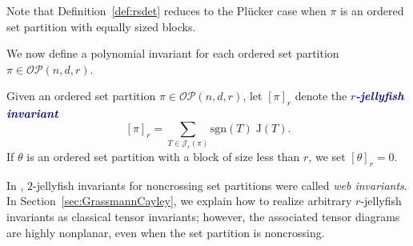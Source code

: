 \documentclass[ALCO, Unicode]{cedram}
\numberwithin{equation}{section}
\newcommand{\rstab}{\mathcal{J}}
\newcommand{\rspoly}{\mathrm{J}}
\newcommand{\sgn}{\mathrm{sgn}}
\newcommand{\ordsetpart}{\mathcal{OP}}
\newcommand{\newword}[1]{\textcolor{darkblue}{\textbf{\emph{#1}}}}
\begin{document}
Note that Definition~\ref{def:rsdet} reduces to the Pl\"ucker case when $\pi$ is an ordered set partition with equally sized blocks.

We now define a polynomial invariant for each ordered set partition $\pi\in\ordsetpart(n,d,r)$. 

\begin{definition}
\label{def:polynomial}
Given an ordered set partition $\pi\in\ordsetpart(n,d,r)$, let $[\pi]_r$ denote the \newword{$r$-jellyfish invariant} \[
[\pi]_r = \sum_{T\in \rstab_r(\pi)}\sgn(T) \; \rspoly(T).
\]
If $\theta$ is an ordered set partition with a block of size less than $r$, we set $[\theta]_r=0$.
\end{definition}

\begin{remark}
In \cite{Patrias.Pechenik.Striker}, $2$-jellyfish invariants for noncrossing set partitions were called \emph{web invariants}. In Section~\ref{sec:GrassmannCayley}, we explain how to realize arbitrary $r$-jellyfish invariants as classical tensor invariants; however, the associated tensor diagrams are highly nonplanar, even when the set partition is noncrossing.
\end{remark}
\end{document}
